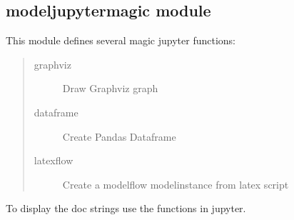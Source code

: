 \documentclass[letterpaper,10pt,english]{sphinxmanual}
\begin{document}
\subsection{modeljupytermagic module}
\label{\detokenize{jupyter/modeljupytermagic:module-modeljupytermagic}}\label{\detokenize{jupyter/modeljupytermagic:modeljupytermagic-module}}\label{\detokenize{jupyter/modeljupytermagic::doc}}
\sphinxAtStartPar
This module defines several magic jupyter functions:
\begin{quote}\begin{description}
\item[{graphviz}] \leavevmode
\sphinxAtStartPar
Draw Graphviz graph

\item[{dataframe}] \leavevmode
\sphinxAtStartPar
Create Pandas Dataframe

\item[{latexflow}] \leavevmode
\sphinxAtStartPar
Create a modelflow modelinstance from latex script

\end{description}\end{quote}

\sphinxAtStartPar
To display the doc strings use the functions in jupyter.
\end{document}
